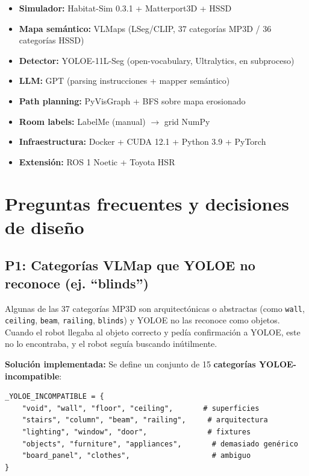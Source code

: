\documentclass[11pt,a4paper]{article}
\begin{document}
\begin{itemize}
    \item \textbf{Simulador:} Habitat-Sim 0.3.1 + Matterport3D + HSSD
    \item \textbf{Mapa semántico:} VLMaps (LSeg/CLIP, 37 categorías MP3D / 36 categorías HSSD)
    \item \textbf{Detector:} YOLOE-11L-Seg (open-vocabulary, Ultralytics, en subproceso)
    \item \textbf{LLM:} GPT (parsing instrucciones + mapper semántico)
    \item \textbf{Path planning:} PyVisGraph + BFS sobre mapa erosionado
    \item \textbf{Room labels:} LabelMe (manual) $\rightarrow$ grid NumPy
    \item \textbf{Infraestructura:} Docker + CUDA 12.1 + Python 3.9 + PyTorch
    \item \textbf{Extensión:} ROS 1 Noetic + Toyota HSR
\end{itemize}

\section{Preguntas frecuentes y decisiones de diseño}

\subsection{P1: Categorías VLMap que YOLOE no reconoce (ej. ``blinds'')}

Algunas de las 37 categorías MP3D son arquitectónicas o abstractas (como \texttt{wall}, \texttt{ceiling}, \texttt{beam}, \texttt{railing}, \texttt{blinds}) y YOLOE no las reconoce como objetos. Cuando el robot llegaba al objeto correcto y pedía confirmación a YOLOE, este no lo encontraba, y el robot seguía buscando inútilmente.

\textbf{Solución implementada:} Se define un conjunto de 15 \textbf{categorías YOLOE-incompatible}:

\begin{verbatim}
_YOLOE_INCOMPATIBLE = {
    "void", "wall", "floor", "ceiling",       # superficies
    "stairs", "column", "beam", "railing",     # arquitectura
    "lighting", "window", "door",              # fixtures
    "objects", "furniture", "appliances",       # demasiado genérico
    "board_panel", "clothes",                   # ambiguo
}
\end{verbatim}
\end{document}
